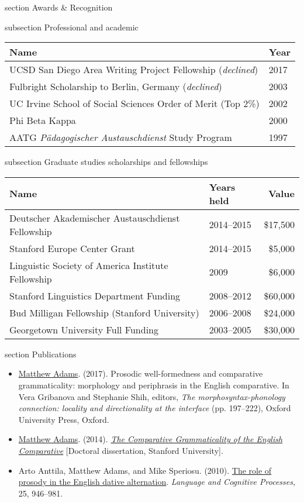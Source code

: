 \documentclass[10pt]{article}
\newcommand{\sectionhead}[1]{%
\begin{bgbox}{section}%
{\Large \textsf{#1}}%
\end{bgbox}%
}
\newcommand{\subsectionhead}[1]{%
\begin{bgbox}{subsection}%
{\small \textsf{#1}}%
\end{bgbox}%
}
\begin{document}
\newpage
\sectionhead{Awards \& Recognition}
\label{Awards}
\subsectionhead{Professional and academic}
\label{sec:orga33585d}

\begin{center}
\begin{tabular}{ll}
\hline
\textbf{Name} & \textbf{Year}\\
\hline
UCSD San Diego Area Writing Project Fellowship (\emph{declined}) & 2017\\
Fulbright Scholarship to Berlin, Germany (\emph{declined}) & 2003\\
UC Irvine School of Social Sciences Order of Merit (Top 2\%) & 2002\\
Phi Beta Kappa & 2000\\
AATG \emph{Pädagogischer Austauschdienst} Study Program & 1997\\
\hline
\end{tabular}
\end{center}

\subsectionhead{Graduate studies scholarships and fellowships}
\label{Graduate-studies-scholarships-and-fellowships}
\begin{center}
\begin{tabular}{llr}
\hline
\textbf{Name} & \textbf{Years held} & \textbf{Value}\\
\hline
Deutscher Akademischer Austauschdienst Fellowship & 2014--2015 & \$17,500\\
Stanford Europe Center Grant & 2014--2015 & \$5,000\\
Linguistic Society of America Institute Fellowship & 2009 & \$6,000\\
Stanford Linguistics Department Funding & 2008--2012 & \$60,000\\
Bud Milligan Fellowship (Stanford University) & 2006--2008 & \$24,000\\
Georgetown University Full Funding & 2003--2005 & \$30,000\\
\hline
\end{tabular}
\end{center}
\sectionhead{Publications}
\label{Publications}
\small

\begin{itemize}
\item \href{https://scholar.google.com/citations?user=-k9s2XwAAAAJ\&hl=en}{Matthew Adams}. (2017). Prosodic well-formedness and comparative grammaticality: morphology and periphrasis in the English comparative. In Vera Gribanova and Stephanie Shih, editors, \emph{The morphosyntax-phonology connection: locality and directionality at the interface} (pp. 197--222), Oxford University Press, Oxford.
\item \href{https://scholar.google.com/citations?user=-k9s2XwAAAAJ\&hl=en}{Matthew Adams}. (2014). \emph{\href{https://searchworks.stanford.edu/view/10530947}{The Comparative Grammaticality of the English Comparative}} [Doctoral dissertation, Stanford University].
\item Arto Anttila, Matthew Adams, and Mike Speriosu. (2010). \href{http://www.tandfonline.com/doi/full/10.1080/01690960903525481}{The role of prosody in the English dative alternation}. \emph{Language and Cognitive Processes}, 25, 946--981.
\end{itemize}
\end{document}
